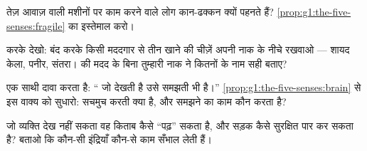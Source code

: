 \begin{exercise}[$\star$]\label{exo:g1:the-five-senses:7}
तेज़ आवाज़ वाली मशीनों पर काम करने वाले लोग कान-ढक्कन क्यों पहनते
हैं? \cref{prop:g1:the-five-senses:fragile} का इस्तेमाल करो।
\end{exercise}

\begin{exercise}[$\star$]\label{exo:g1:the-five-senses:8}
करके देखो:  बंद करके किसी मददगार से तीन खाने की चीज़ें अपनी नाक
के नीचे रखवाओ --- शायद केला, पनीर, संतरा।  की मदद के बिना
तुम्हारी नाक ने कितनों के नाम सही बताए?
\end{exercise}

\begin{exercise}[$\star\star$]\label{exo:g1:the-five-senses:9}
एक साथी दावा करता है: `` जो देखती है उसे समझती भी है।''
\cref{prop:g1:the-five-senses:brain} से इस वाक्य को सुधारो:  सचमुच
करती क्या है, और समझने का काम कौन करता है?
\end{exercise}

\begin{exercise}[$\star\star$]\label{exo:g1:the-five-senses:10}
जो व्यक्ति देख नहीं सकता वह किताब कैसे ``पढ़'' सकता है, और सड़क कैसे
सुरक्षित पार कर सकता है? बताओ कि कौन-सी इंद्रियाँ कौन-से काम सँभाल
लेती हैं।
\end{exercise}
